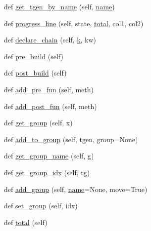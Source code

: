 \begin{DoxyCompactItemize}
\item 
def \hyperlink{classwaflib_1_1_build_1_1_build_context_a158dba08b64d4a73b21a907ebe577017}{get\+\_\+tgen\+\_\+by\+\_\+name} (self, \hyperlink{lib_2expat_8h_a1b49b495b59f9e73205b69ad1a2965b0}{name})
\item 
def \hyperlink{classwaflib_1_1_build_1_1_build_context_af6341267231cfa8cabdfd595aede71fc}{progress\+\_\+line} (self, state, \hyperlink{classwaflib_1_1_build_1_1_build_context_a9242bac9596041fb6e91bd4f7cdbac51}{total}, col1, col2)
\item 
def \hyperlink{classwaflib_1_1_build_1_1_build_context_a6d24341f3d68e2a5a3987300d3d017fa}{declare\+\_\+chain} (self, \hyperlink{rfft2d_test_m_l_8m_adc468c70fb574ebd07287b38d0d0676d}{k}, kw)
\item 
def \hyperlink{classwaflib_1_1_build_1_1_build_context_a31b06f39986abefe3e129998b079f679}{pre\+\_\+build} (self)
\item 
def \hyperlink{classwaflib_1_1_build_1_1_build_context_aa8a25dd6bc5b621fa21d9806525e03df}{post\+\_\+build} (self)
\item 
def \hyperlink{classwaflib_1_1_build_1_1_build_context_a6ebf18db9a2bccd92de1506d261d7f03}{add\+\_\+pre\+\_\+fun} (self, meth)
\item 
def \hyperlink{classwaflib_1_1_build_1_1_build_context_a64d6fb9f73868bc70922fabaa0682fef}{add\+\_\+post\+\_\+fun} (self, meth)
\item 
def \hyperlink{classwaflib_1_1_build_1_1_build_context_ae9d4d76df236217e6c1ba262df1a7376}{get\+\_\+group} (self, x)
\item 
def \hyperlink{classwaflib_1_1_build_1_1_build_context_a4454ed8386bb714afcd240eedc360720}{add\+\_\+to\+\_\+group} (self, tgen, group=None)
\item 
def \hyperlink{classwaflib_1_1_build_1_1_build_context_a70172b57dd578379f3de337a479d1463}{get\+\_\+group\+\_\+name} (self, g)
\item 
def \hyperlink{classwaflib_1_1_build_1_1_build_context_a8b0e6338acd281989d32dd8a1502e745}{get\+\_\+group\+\_\+idx} (self, tg)
\item 
def \hyperlink{classwaflib_1_1_build_1_1_build_context_a9e1a6200ab3e854ecc9041a5e9abaa78}{add\+\_\+group} (self, \hyperlink{lib_2expat_8h_a1b49b495b59f9e73205b69ad1a2965b0}{name}=None, move=True)
\item 
def \hyperlink{classwaflib_1_1_build_1_1_build_context_a00550c82b40990a204a19c29aee9bfe6}{set\+\_\+group} (self, idx)
\item 
def \hyperlink{classwaflib_1_1_build_1_1_build_context_a9242bac9596041fb6e91bd4f7cdbac51}{total} (self)

\end{DoxyCompactItemize}
